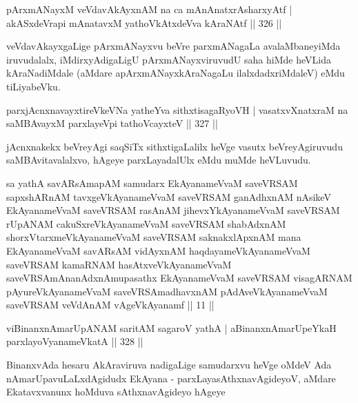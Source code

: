 \begin{shl}
pArxmANayxM veVdavAkAyxnAM na ca mAnAnatxrAsharxyAtf |
akASxdeVrapi mAnatavxM yathoVkAtxdeVva kAraNAtf \hfill || 326 ||
\end{shl}

\begin{artha}
veVdavAkayxgaLige pArxmANayxvu beVre parxmANagaLa avalaMbaneyiMda iruvudalalx, iMdirxyAdigaLigU pArxmANayxviruvudU saha hiMde heVLida kAraNadiMdale (aMdare apArxmANayxkAraNagaLu ilalxdadxriMdaleV) eMdu tiLiyabeVku.
\end{artha}


\begin{shl}
parxjAcnxnavayxtireVkeVNa yatheYva sithxtisagaRyoVH |
vasatxvXnatxraM na saMBAvayxM parxlayeV\s pi tathoVcayxteV \hfill || 327 ||
\end{shl}

\begin{artha}
jAcnxnakekx beVreyAgi saqSiTx sithxtigaLalilx heVge vasutx beVreyAgiruvudu saMBAvitavalalxvo, hAgeye parxLayadalUlx eMdu muMde heVLuvudu.
\end{artha}


\begin{kandikeshl}
sa yathA savARsAmapAM samudarx EkAyanameVvaM saveVRSAM sapxshARnAM tavxgeVkAyanameVvaM saveVRSAM ganAdhxnAM nAsikeV EkAyanameVvaM saveVRSAM rasAnAM jihevxYkAyanameVvaM saveVRSAM rUpANAM cakuSxreVkAyanameVvaM saveVRSAM shabAdxnAM shorxVtarxmeVkAyanameVvaM saveVRSAM saknakxlApxnAM mana EkAyanameVvaM savARsAM vidAyxnAM haqdayameVkAyanameVvaM saveVRSAM kamaRNAM hasAtxveVkAyanameVvaM saveVRSAmAnanAdxnAmupasathx EkAyanameVvaM saveVRSAM visagARNAM pAyureVkAyanameVvaM saveVRSAmadhavxnAM pAdAveVkAyanameVvaM saveVRSAM veVdAnAM vAgeVkAyanamf || 11 || 
\end{kandikeshl}

\begin{shl}
viBinanxnAmarUpANAM saritAM sagaroV yathA |
aBinanxnAmarUpeYkaH parxlayoV\s yanameVkatA \hfill || 328 ||
\end{shl}

\begin{artha}
BinanxvAda hesaru AkAraviruva nadigaLige samudarxvu heVge oMdeV Ada nAmarUpavuLaLxdAgidudx EkAyana - parxLayasAthxnavAgideyoV, aMdare Ekatavxvanunx hoMduva sAthxnavAgideyo hAgeye
\end{artha}

